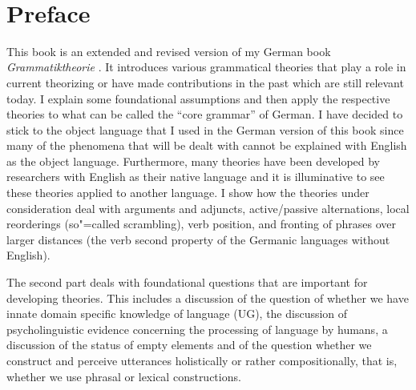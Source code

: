 
\thispagestyle{empty}~\newpage\setcounter{page}{7}%


\tableofcontents


\chapter*{Preface}

This book is an extended and revised version of my German book \emph{Grammatiktheorie}
\citep{MuellerGTBuch2}. It introduces various grammatical theories that play a role in current
theorizing or have made contributions in the past which are still relevant today. I explain some foundational
assumptions and then apply the respective theories to what can be called the ``core grammar'' of
German. I have decided to stick to the object language that I used in the German version of this
book since many of the phenomena that will be dealt with cannot be explained with English as the object
language. Furthermore, many theories have been developed by researchers with English as their native
language and it is illuminative to see these theories applied to another language.
I show how the theories under consideration deal with arguments and adjuncts, active/passive
alternations, local reorderings (so"=called scrambling), verb position, and fronting of phrases over
larger distances (the verb second property of the Germanic languages without English).

The second part deals with foundational questions that are important for developing theories.
This includes a discussion of the question of whether we have innate domain specific knowledge of
language (UG), the discussion of psycholinguistic evidence concerning the processing of language by
humans, a discussion of the status of empty elements and of the question whether we construct and perceive utterances 
holistically or rather compositionally, that is, whether we use phrasal or lexical constructions.


